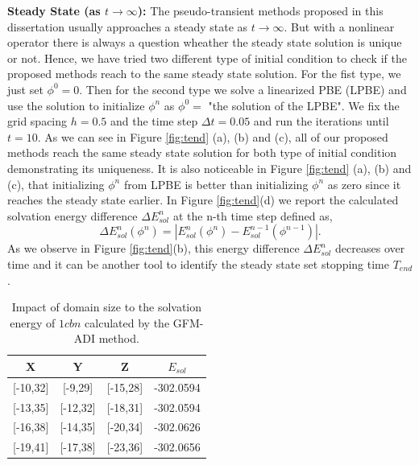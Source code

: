 {\bf Steady State (as $t\rightarrow \infty$):} The pseudo-transient methods proposed in this dissertation usually approaches a steady state as $t\rightarrow \infty$. But with a nonlinear operator there is always a question wheather the steady state solution is unique or not. 
Hence, we have tried two different type of initial condition to check if the proposed methods reach to the same steady state solution. For the fist type, we just set $\phi^0=0$. Then for the second type we solve a linearized PBE (LPBE) \cite{Zhao2011} and use the solution to initialize $\phi^n$ as $\phi^0 = $ "the solution of the LPBE". We fix the grid spacing $h = 0.5$ and the time step $\Delta t = 0.05$ and run the iterations until $t = 10$.
As we can see in Figure \ref{fig:tend} (a), (b) and (c), all of our proposed methods reach the same steady state solution for both type of initial condition demonstrating its uniqueness. It is also noticeable in Figure \ref{fig:tend} (a), (b) and (c), that initializing $\phi^n$ from LPBE is better than initializing $\phi^n$ as zero since it reaches the steady state earlier.     
  In Figure \ref{fig:tend}(d) we report the calculated solvation energy difference $\Delta E^n_{sol}$ at the n-th time step defined as,
\begin{equation}
	\Delta E^n_{sol}(\phi^n)= |E^n_{sol}(\phi^n)-E^{n-1}_{sol}(\phi^{n-1})|.
\end{equation}
As we observe in Figure \ref{fig:tend}(b), this energy difference $\Delta E^n_{sol}$ decreases over time and it can be another tool to identify the steady state set stopping time $T_{end}$.
\begin{table}[!ht]
\begin{center}
\begin{tabular}{c c c c }
\hline
X            & Y            & Z            & $E_{sol}$    \\ \hline
{[}-10,32{]} & {[}-9,29{]}  & {[}-15,28{]} & -302.0594 \\ \hline
{[}-13,35{]} & {[}-12,32{]} & {[}-18,31{]} & -302.0594\\ \hline
{[}-16,38{]} & {[}-14,35{]} & {[}-20,34{]} & -302.0626 \\ \hline
{[}-19,41{]} & {[}-17,38{]} & {[}-23,36{]} & -302.0656\\ \hline
\end{tabular}
\end{center}
\caption{Impact of domain size to the solvation energy of $1cbn$ calculated by the GFM-ADI method.}
\label{tab:domain}
\end{table}

